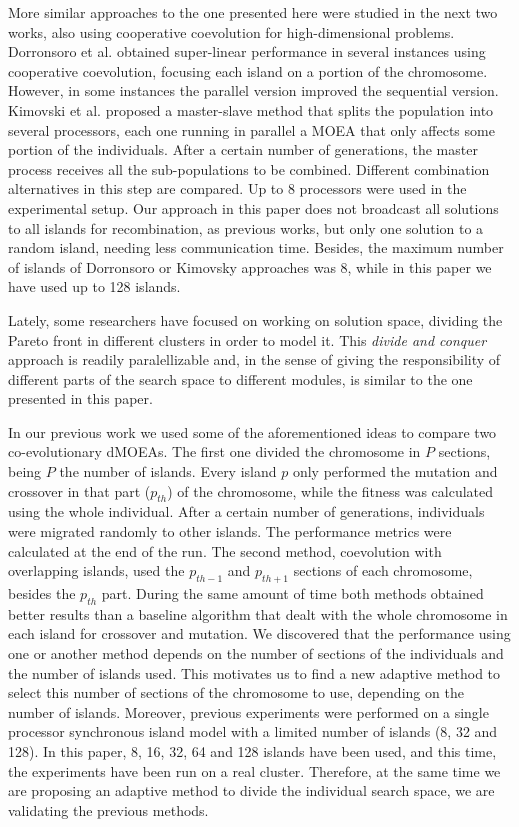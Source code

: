 \documentclass[preprint]{elsarticle}
\begin{document}
More similar approaches to the one presented here were studied in the
next two works, also using cooperative coevolution for high-dimensional problems. 
Dorronsoro et al. \citep{Dorronsoro13superlinear} obtained super-linear performance
in several instances using cooperative coevolution, focusing each island on a portion of the chromosome. However, in some instances the parallel version 
improved the sequential version. Kimovski et al. \citep{Kimovski15Parallel} proposed a
master-slave method that splits the population into several processors,
each one running in parallel a MOEA that only affects some portion of
the individuals. After a certain number of generations, the master
process receives all the sub-populations to be combined. Different
combination alternatives in this step are compared. Up to 8 processors
were used in the experimental setup. Our approach in this paper does not
broadcast all solutions to all islands for recombination, as previous
works, but only one solution to a random island, needing less
communication time. Besides, the maximum number of islands of
Dorronsoro or Kimovsky approaches was 8, while in this paper we have
used up to 128 islands. 

Lately, some researchers \citep{cheng2015adaptive} have focused on
working on solution space, dividing the Pareto front in different
clusters in order to model it. This {\em divide and conquer} approach
is readily paralellizable and, in the sense of giving the
responsibility of different parts of the search space to different
modules, is similar to the one presented in this paper.

In our previous work \citep{Garcia16hpmoon} we used some of
the aforementioned ideas to compare two co-evolutionary dMOEAs. The first
one divided the chromosome in $P$ sections, being $P$ the number of
islands. Every island $p$ only performed the mutation and crossover in
that part ($p_{th}$) of the chromosome, while the fitness was
calculated using the whole individual. After a certain number of
generations, individuals were migrated randomly to other islands. The
performance metrics were calculated at the end of the run. The second
method, coevolution with overlapping islands, used the $p_{th-1}$ and
$p_{th+1}$ sections of each chromosome, besides the $p_{th}$
part. During the same amount of time both methods obtained better
results than a baseline algorithm that dealt with the whole chromosome
in each island for crossover and mutation. We discovered that the
performance using one or another method depends on the number of
sections of the individuals and the number of islands used. This
motivates us to find a new adaptive method to select this number of
sections of the chromosome to use, depending on the number of
islands. Moreover, previous experiments were performed on a single
processor synchronous island model with a limited number of islands
(8, 32 and 128). In this paper,  8, 16, 32, 64 and 128 islands have
been used, and this time, the experiments have been run on a real
cluster. Therefore, at the same time we are proposing an adaptive
method to divide the individual search space, we are validating the
previous methods. 
\end{document}
